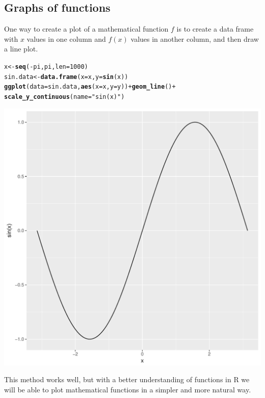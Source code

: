\documentclass[12pt,oneside]{book}\usepackage[]{graphicx}\usepackage[]{color}
\makeatletter
\def\maxwidth{ %
  \ifdim\Gin@nat@width>\linewidth
    \linewidth
  \else
    \Gin@nat@width
  \fi
}
\newcommand{\hlnum}[1]{\textcolor[rgb]{0.686,0.059,0.569}{#1}}%
\newcommand{\hlstr}[1]{\textcolor[rgb]{0.192,0.494,0.8}{#1}}%
\newcommand{\hlopt}[1]{\textcolor[rgb]{0,0,0}{#1}}%
\newcommand{\hlstd}[1]{\textcolor[rgb]{0.345,0.345,0.345}{#1}}%
\newcommand{\hlkwb}[1]{\textcolor[rgb]{0.69,0.353,0.396}{#1}}%
\newcommand{\hlkwc}[1]{\textcolor[rgb]{0.333,0.667,0.333}{#1}}%
\newcommand{\hlkwd}[1]{\textcolor[rgb]{0.737,0.353,0.396}{\textbf{#1}}}%
\newenvironment{kframe}{%
 \def\at@end@of@kframe{}%
 \ifinner\ifhmode%
  \def\at@end@of@kframe{\end{minipage}}%
  \begin{minipage}{\columnwidth}%
 \fi\fi%
 \def\FrameCommand##1{\hskip\@totalleftmargin \hskip-\fboxsep
 \colorbox{shadecolor}{##1}\hskip-\fboxsep
     \hskip-\linewidth \hskip-\@totalleftmargin \hskip\columnwidth}%
 \MakeFramed {\advance\hsize-\width
   \@totalleftmargin\z@ \linewidth\hsize
   \@setminipage}}%
 {\par\unskip\endMakeFramed%
 \at@end@of@kframe}
\newenvironment{knitrout}{}{} %
\makeatother
\begin{document}
\subsection{Graphs of functions}
One way to create a plot of a mathematical function $f$ is to create a data frame with $x$ values in one column and $f(x)$ values in another column, and then draw a line plot. 
\begin{knitrout}
\color{fgcolor}\begin{kframe}
\begin{alltt}
\hlstd{x} \hlkwb{<-} \hlkwd{seq}\hlstd{(}\hlopt{-}\hlstd{pi, pi,} \hlkwc{len} \hlstd{=} \hlnum{1000}\hlstd{)}
\hlstd{sin.data} \hlkwb{<-} \hlkwd{data.frame}\hlstd{(}\hlkwc{x} \hlstd{= x,} \hlkwc{y} \hlstd{=} \hlkwd{sin}\hlstd{(x))}
\hlkwd{ggplot}\hlstd{(}\hlkwc{data} \hlstd{= sin.data,} \hlkwd{aes}\hlstd{(}\hlkwc{x} \hlstd{= x,} \hlkwc{y} \hlstd{= y))} \hlopt{+} \hlkwd{geom_line}\hlstd{()} \hlopt{+}
    \hlkwd{scale_y_continuous}\hlstd{(}\hlkwc{name} \hlstd{=} \hlstr{"sin(x)"}\hlstd{)}
\end{alltt}
\end{kframe}
\includegraphics[width=\maxwidth]{figure/unnamed-chunk-83-1} 

\end{knitrout}
This method works well, but with a better understanding of functions in R we will be able to plot mathematical functions in a simpler and  more natural way. 
\end{document}
